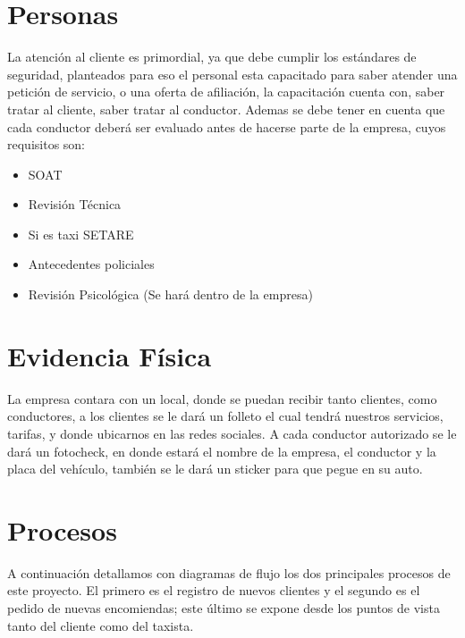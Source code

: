 \section{Personas}
La atención al cliente es primordial, ya que debe cumplir los estándares de seguridad, planteados para eso el personal esta capacitado para saber atender una petición de servicio, o una oferta de afiliación, la capacitación cuenta con, saber tratar al cliente, saber tratar al conductor. 
Ademas se debe tener en cuenta que cada conductor deberá ser evaluado antes de hacerse parte de la empresa, cuyos requisitos son:
\begin{itemize}
\item SOAT
\item Revisión Técnica 
\item Si es taxi SETARE
\item Antecedentes policiales
\item Revisión Psicológica (Se hará dentro de la empresa)

\end{itemize}

\section{Evidencia Física}
La empresa contara con un local, donde se puedan recibir tanto clientes, como conductores, a los clientes se le dará un folleto el cual tendrá nuestros servicios, tarifas, y donde ubicarnos en las redes sociales.
A cada conductor autorizado se le dará un fotocheck, en donde estará el nombre de la empresa, el conductor y la placa del vehículo, también se le dará un sticker para que pegue en su auto.


\section{Procesos}

A continuación detallamos con diagramas de flujo los dos principales procesos de este proyecto. El primero es el registro de nuevos clientes y el segundo es el pedido de nuevas encomiendas; este último se expone desde los puntos de vista tanto del cliente como del taxista.

